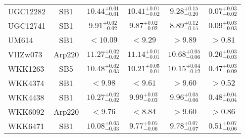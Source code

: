 \documentclass[onecolumn]{mn2e}
\begin{document}
{\begin{center}
\begin{longtable}{lccccc}
UGC12282 & SB1 & $10.44_{-0.01}^{+0.01}$ & $10.41_{-0.02}^{+0.01}$ & $9.28_{-0.20}^{+0.15}$ &$0.07_{-0.02}^{+0.03}$ \\
UGC12741 & SB1 & $9.91_{-0.02}^{+0.02}$ & $9.87_{-0.02}^{+0.02}$ & $8.89_{-0.15}^{+0.12}$ &$0.09_{-0.03}^{+0.03}$ \\
UM614 & SB1 & $<10.09$ & $<9.29$ & $>9.89$ &$>0.81$ \\
VIIZw073 & Arp220 & $11.27_{-0.02}^{+0.02}$ & $11.14_{-0.01}^{+0.01}$ & $10.68_{-0.06}^{+0.05}$ &$0.26_{-0.03}^{+0.03}$ \\
WKK1263 & SB5 & $10.48_{-0.03}^{+0.02}$ & $10.21_{-0.01}^{+0.05}$ & $10.15_{-0.12}^{+0.04}$ &$0.47_{-0.09}^{+0.03}$ \\
WKK4374 & SB1 & $<9.98$ & $<9.61$ & $>9.60$ &$>0.52$ \\
WKK4438 & SB1 & $10.27_{-0.02}^{+0.02}$ & $9.99_{-0.03}^{+0.03}$ & $9.96_{-0.06}^{+0.05}$ &$0.48_{-0.04}^{+0.04}$ \\
WKK6092 & Arp220 & $<9.76$ & $<8.84$ & $>9.60$ &$>0.86$ \\
WKK6471 & SB1 & $10.08_{-0.03}^{+0.03}$ & $9.77_{-0.06}^{+0.05}$ & $9.78_{-0.07}^{+0.07}$ &$0.51_{-0.06}^{+0.07}$ \\

\end{longtable}
\end{center}
}
\end{document}
